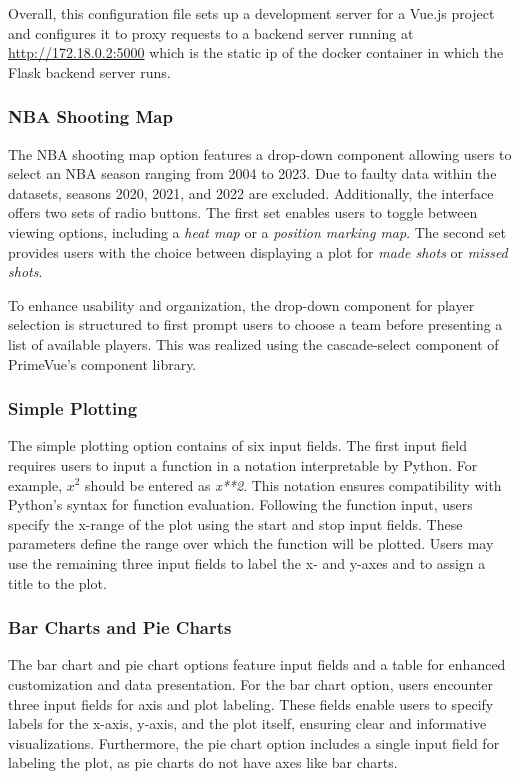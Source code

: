 \documentclass[sn-mathphys-num]{sn-jnl}%
\theoremstyle{thmstyleone}%
\theoremstyle{thmstyletwo}%
\theoremstyle{thmstylethree}%
\begin{document}
Overall, this configuration file sets up a development server for a Vue.js project and configures it to proxy requests to a backend server running at \url{http://172.18.0.2:5000} which is the static ip of the docker container in which the Flask backend server runs.

\subsubsection{NBA Shooting Map}\label{subsubsec1}

The NBA shooting map option features a drop-down component allowing users to select an NBA season ranging from 2004 to 2023. Due to faulty data within the datasets, seasons 2020, 2021, and 2022 are excluded. Additionally, the interface offers two sets of radio buttons. The first set enables users to toggle between viewing options, including a \textit{heat map} or a \textit{position marking map}. The second set provides users with the choice between displaying a plot for \textit{made shots} or \textit{missed shots}.

To enhance usability and organization, the drop-down component for player selection is structured to first prompt users to choose a team before presenting a list of available players. This was realized using the cascade-select component of PrimeVue's component library.


\subsubsection{Simple Plotting}\label{subsubsec2}

The simple plotting option contains of six input fields. The first input field requires users to input a function in a notation interpretable by Python. For example, $x^2$ should be entered as \textit{x**2}. This notation ensures compatibility with Python's syntax for function evaluation. Following the function input, users specify the x-range of the plot using the start and stop input fields. These parameters define the range over which the function will be plotted. Users may use the remaining three input fields to label the x- and y-axes and to assign a title to the plot.

\subsubsection{Bar Charts and Pie Charts}\label{subsubsec3}

The bar chart and pie chart options feature input fields and a table for enhanced customization and data presentation. For the bar chart option, users encounter three input fields for axis and plot labeling. These fields enable users to specify labels for the x-axis, y-axis, and the plot itself, ensuring clear and informative visualizations. Furthermore, the pie chart option includes a single input field for labeling the plot, as pie charts do not have axes like bar charts.
\end{document}
